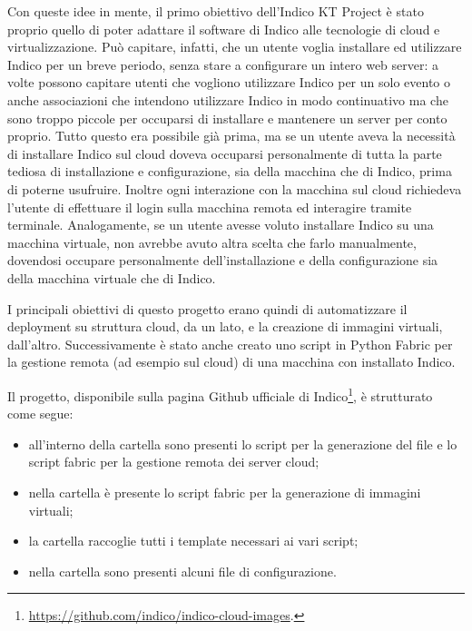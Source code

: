     Con queste idee in mente, il primo obiettivo dell'Indico KT Project è stato proprio quello di poter adattare il software di Indico alle tecnologie di cloud e virtualizzazione. Può capitare, infatti, che un utente voglia installare ed utilizzare Indico per un breve periodo, senza stare a configurare un intero web server: a volte possono capitare utenti che vogliono utilizzare Indico per un solo evento o anche associazioni che intendono utilizzare Indico in modo continuativo ma che sono troppo piccole per occuparsi di installare e mantenere un server per conto proprio. Tutto questo era possibile già prima, ma se un utente aveva la necessità di installare Indico sul cloud doveva occuparsi personalmente di tutta la parte tediosa di installazione e configurazione, sia della macchina che di Indico, prima di poterne usufruire. Inoltre ogni interazione con la macchina sul cloud richiedeva l'utente di effettuare il login sulla macchina remota ed interagire tramite terminale. Analogamente, se un utente avesse voluto installare Indico su una macchina virtuale, non avrebbe avuto altra scelta che farlo manualmente, dovendosi occupare personalmente dell'installazione e della configurazione sia della macchina virtuale che di Indico.
    
    I principali obiettivi di questo progetto erano quindi di automatizzare il deployment su struttura cloud, da un lato, e la creazione di immagini virtuali, dall'altro. Successivamente è stato anche creato uno script in Python Fabric per la gestione remota (ad esempio sul cloud) di una macchina con installato Indico.
    
    Il progetto, disponibile sulla pagina Github ufficiale di Indico\footnote{\url{https://github.com/indico/indico-cloud-images}.}, è strutturato come segue:
    
    \begin{itemize}
        \item all'interno della cartella  sono presenti lo script per la generazione del file  e lo script fabric per la gestione remota dei server cloud;
        \item nella cartella  è presente lo script fabric per la generazione di immagini virtuali;
        \item la cartella  raccoglie tutti i template necessari ai vari script;
        \item nella cartella  sono presenti alcuni file di configurazione.
    \end{itemize}
    
